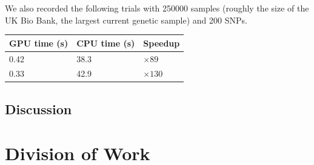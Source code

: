 \documentclass[12pt]{article}
\begin{document}
We also recorded the following trials with 250000 samples
(roughly the size of the UK Bio Bank, the largest current genetic sample)
and 200 SNPs.

\begin{table}[!ht]
  \begin{tabular}{ll|l}
    GPU time (s) & CPU time (s) & Speedup \\
    \hline
    0.42 & 38.3 & $\times 89$ \\
    0.33 & 42.9 & $\times 130$ \\
  \end{tabular}
\end{table}

\subsection{Discussion}

\section{Division of Work}



\end{document}
